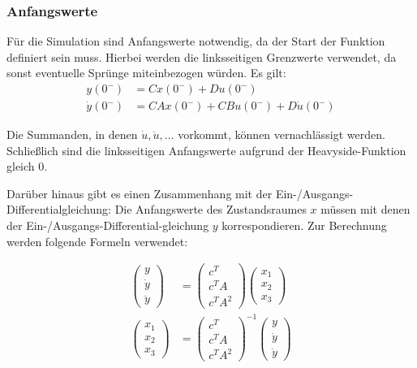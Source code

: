 \subsubsection*{Anfangswerte}

Für die Simulation sind Anfangswerte notwendig, da der Start der Funktion definiert sein muss. Hierbei werden die linksseitigen Grenzwerte verwendet, da sonst eventuelle Sprünge miteinbezogen würden. Es gilt:
\begin{align*}
    y(0^-) & = Cx(0^-) + Du(0^-) \\
    \dot y(0^-) & = CAx(0^-) + CBu(0^-) + D \dot u (0^-)
\end{align*}

Die Summanden, in denen $\dot u, \ddot u, \ldots$ vorkommt, können vernachlässigt werden. Schließlich sind die linksseitigen Anfangswerte aufgrund der Heavyside-Funktion gleich 0.

Darüber hinaus gibt es einen Zusammenhang mit der Ein-/Ausgangs-Differentialgleichung: Die Anfangswerte des Zustandsraumes $x$ müssen mit denen der Ein-/Ausgangs-Differential-gleichung $y$ korrespondieren. Zur Berechnung werden folgende Formeln verwendet:

\begin{align*}
    \left(\begin{array}{c} y \\ \dot y \\ \ddot y \end{array}\right) &= \left(\begin{array}{l} c^T \\ c^T A \\ c^T A^2 \end{array}\right) \left(\begin{array}{c} x_1 \\ x_2 \\ x_3 \end{array}\right) \\
    \left(\begin{array}{c} x_1 \\ x_2 \\ x_3 \end{array}\right) &= \left(\begin{array}{l} c^T \\ c^T A \\ c^T A^2 \end{array}\right)^{-1} \left(\begin{array}{c} y \\ \dot y \\ \ddot y \end{array}\right)
\end{align*}


